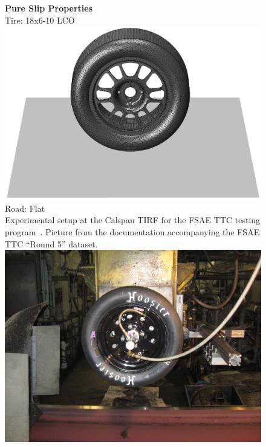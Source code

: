 \begin{figure}[htb]
  \centering
  \begin{minipage}[c]{0.70\linewidth}
    \raggedleft
  \end{minipage}%
  \hfill
  \begin{minipage}[c]{0.29\linewidth}
    \centering
    \textbf{Pure Slip Properties} \\[0.4em]
    Tire: \Hoosier{} 18x6-10 LCO \\[0.4em]
    \includegraphics[width=1.0\linewidth, trim={13.5cm 4.25cm 11.5cm 6.0cm}, clip]{./figures/appendix_3/render_hoosier}
    Road: Flat \\[4.0em]
    Experimental setup at the Calspan \ac{TIRF} for the \ac{FSAE} \ac{TTC} testing program~\cite{kasprzak2006formula}. Picture from the documentation accompanying the \ac{FSAE} \ac{TTC} ``Round 5'' dataset. \\[0.4em]
    \includegraphics[width=0.9\linewidth]{./figures/appendix_3/hoosier_calspan}

\end{minipage}
\end{figure}
